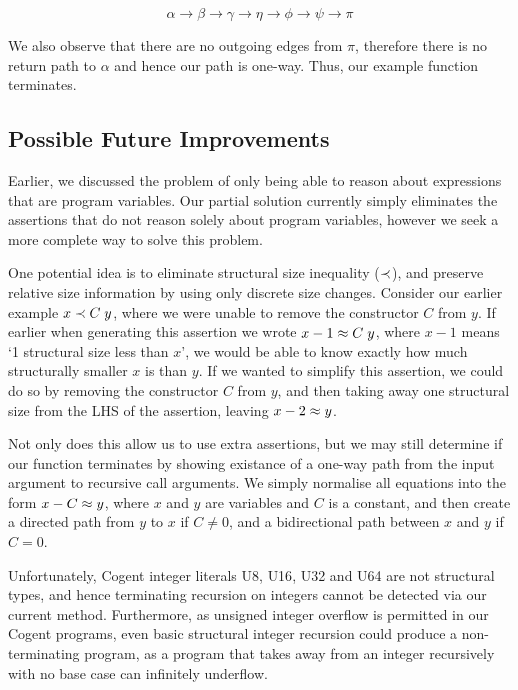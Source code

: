 \[
    \alpha \rightarrow \beta \rightarrow \gamma \rightarrow
    \eta   \rightarrow \phi  \rightarrow \psi   \rightarrow
    \pi
\]

We also observe that there are no outgoing edges from $\pi$, therefore there is no return path
to $\alpha$ and hence our path is one-way. Thus, our example function terminates.


\subsection{Possible Future Improvements}

Earlier, we discussed the problem of only being able to reason about expressions that are
program variables. Our partial solution currently simply eliminates the assertions that
do not reason solely about program variables, however we seek a more complete way to solve
this problem.

One potential idea is to eliminate structural size inequality ($\prec$), and preserve relative
size information by using only discrete size changes. Consider our earlier example $x \prec C\; y$,
where we were unable to remove the constructor $C$ from $y$. 
If earlier when generating this assertion we wrote  $x - 1 \approx C\; y$,
where $x - 1$ means `1 structural size less than $x$', we would be able to know exactly
how much structurally smaller $x$ is than $y$. If we wanted to simplify this assertion,
we could do so by removing the constructor $C$ from $y$, and then taking away one structural size from
the LHS of the assertion, leaving $x - 2 \approx y$.

Not only does this allow us to use extra assertions, but we may still determine 
if our function terminates by showing existance of a one-way path from the input
argument to recursive call arguments. We simply normalise all equations into the
form $x - C \approx y$, where $x$ and $y$ are variables and $C$ is a constant, and
then create a directed path from $y$ to $x$ if $C \neq 0$, and a bidirectional
path between $x$ and $y$ if $C = 0$.


Unfortunately, Cogent integer literals \textsc{U8}, \textsc{U16}, \textsc{U32} and
\textsf{U64} are not structural types, and hence terminating recursion on integers
cannot be detected via our current method. Furthermore, as unsigned integer
overflow is permitted in our Cogent programs, even basic structural integer
recursion could produce a non-terminating program, as a program that takes
away from an integer recursively with no base case can infinitely underflow.


